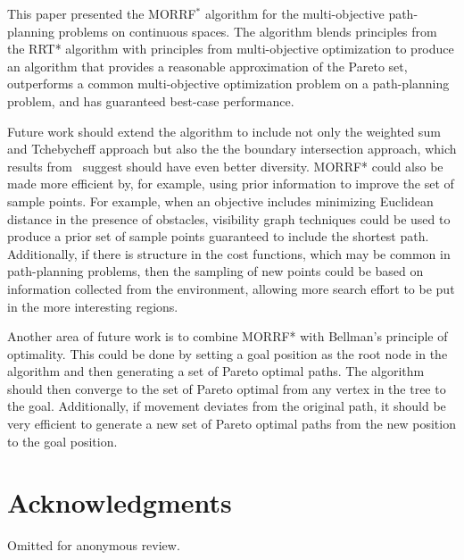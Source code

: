 \documentclass{article}
\begin{document}
This paper presented the MORRF$^{*}$ algorithm for the multi-objective path-planning problems on continuous spaces.
The algorithm blends principles from the RRT* algorithm with principles from multi-objective optimization to produce an algorithm that provides a reasonable approximation of the Pareto set, outperforms a common multi-objective optimization problem on a path-planning problem, and has guaranteed best-case performance.

Future work should extend the algorithm to include not only the weighted sum and Tchebycheff approach but also the the boundary intersection approach, which results from~\cite{4358754} suggest should have even better diversity.
MORRF* could also be made more efficient by, for example, using prior information to improve the set of sample points.
For example, when an objective includes minimizing Euclidean distance in the presence of obstacles, visibility graph techniques could be used to produce a prior set of sample points guaranteed to include the shortest path.
Additionally, if there is structure in the cost functions, which may be common in path-planning problems, then the sampling of new points could be based on information collected from the environment, allowing more search effort to be put in the more interesting regions.

Another area of future work is to combine MORRF* with Bellman's principle of optimality.
This could be done by setting a goal position as the root node in the algorithm and then generating a set of Pareto optimal paths.
The algorithm should then converge to the set of Pareto optimal from any vertex in the tree to the goal.
Additionally, if movement deviates from the original path, it should be very efficient to generate a new set of Pareto optimal paths from the new position to the goal position.

\section*{Acknowledgments}
Omitted for anonymous review.



\end{document}
